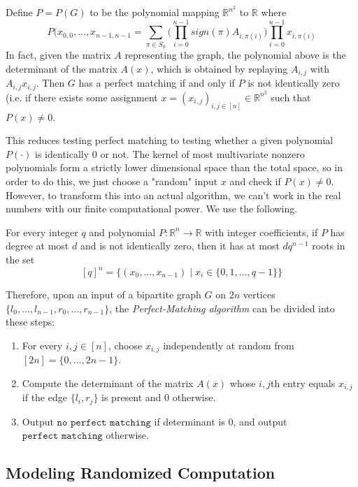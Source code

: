   \begin{lemma}
  Define $P = P(G)$ to be the polynomial mapping $\mathbb{R}^{n^2}$ to $\mathbb{R}$ where 
  \[P(x_{0, 0}, ..., x_{n-1, n-1} = \sum_{\pi \in S_n} \bigg( \prod_{i=0}^{n-1} sign(\pi) A_{i, \pi(i)} \bigg) \prod_{i=0}^{n-1} x_{i, \pi(i)}\]
  In fact, given the matrix $A$ representing the graph, the polynomial above is the determinant of the matrix $A(x)$, which is obtained by replaying $A_{i, j}$ with $A_{i, j} x_{i, j}$. Then $G$ has a perfect matching if and only if $P$ is not identically zero (i.e. if there exists some assignment $x = (x_{i, j})_{i, j \in [n]} \in \mathbb{R}^{n^2}$ such that $P(x) \neq 0$. 
  \end{lemma}
  This reduces testing perfect matching to testing whether a given polynomial $P(\cdot)$ is identically $0$ or not. The kernel of most multivariate nonzero polynomials form a strictly lower dimensional space than the total space, so in order to do this, we just choose a "random" input $x$ and check if $P(x) \neq 0$. However, to transform this into an actual algorithm, we can't work in the real numbers with our finite computational power. We use the following. 

  \begin{theorem}
  For every integer $q$ and polynomial $P: \mathbb{R}^n \longrightarrow \mathbb{R}$ with integer coefficients, if $P$ has degree at most $d$ and is not identically zero, then it has at most $d q^{n-1}$ roots in the set 
  \[[q]^n = \big\{(x_0, ..., x_{n-1}) \;|\; x_i \in \{0, 1, ..., q-1\}\big\}\]
  \end{theorem}

  Therefore, upon an input of a bipartite graph $G$ on $2n$ vertices $\{l_0, ..., l_{n-1}, r_0, ..., r_{n-1}\}$, the \textit{Perfect-Matching algorithm} can be divided into these steps: 
  \begin{enumerate}
    \item For every $i, j \in [n]$, choose $x_{i, j}$ independently at random from $[2n] = \{0, ..., 2n-1\}$. 
    \item Compute the determinant of the matrix $A(x)$ whose $i, j$th entry equals $x_{i, j}$ if the edge $\{l_i, r_j\}$ is present and $0$ otherwise. 
    \item Output $\texttt{no perfect matching}$ if determinant is $0$, and output $\texttt{perfect matching}$ otherwise. 
  \end{enumerate}


  \subsection{Modeling Randomized Computation}

